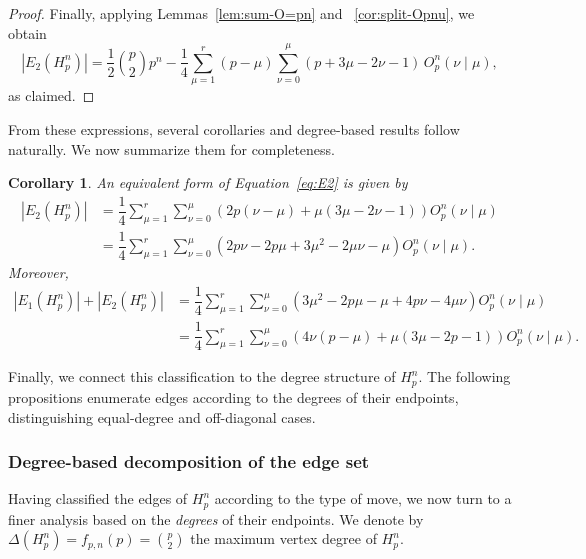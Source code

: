 \documentclass[letterpaper,12pt]{article}
\newtheorem{corollary}{Corollary}
\begin{document}
\begin{proof}
Finally, applying Lemmas~\ref{lem:sum-O=pn} and  ~\ref{cor:split-Opnu}, we obtain
\[
|E_2(H_p^n)| 
= \frac{1}{2} \binom{p}{2} p^n 
- \frac{1}{4} \sum_{\mu = 1}^{r} (p - \mu) 
\sum_{\nu = 0}^{\mu} 
(p + 3\mu - 2\nu - 1)\, O_p^n(\nu \mid \mu),
\]
as claimed.
\end{proof}



\noindent
From these expressions, several corollaries and degree-based results follow naturally.  
We now summarize them for completeness.

\begin{corollary}\label{coro:another_espression_of_E2}  
An equivalent form of Equation~\eqref{eq:E2} is given by
\begin{equation}
    \begin{aligned}
|E_2(H_p^n)|&=\dfrac{1}{4} \sum_{\mu = 1}^{r}  \sum_{\nu = 0}^{\mu} \left( 2p(\nu- \mu)  + \mu( 3\mu- 2\nu - 1) \right) O_p^n(\nu \mid \mu)\\
&=\dfrac{1}{4} \sum_{\mu = 1}^{r}  \sum_{\nu = 0}^{\mu} \left( 2p\nu- 2p\mu  + 3\mu^2- 2\mu\nu - \mu \right) O_p^n(\nu \mid \mu).
\end{aligned}
\end{equation}
Moreover,
\begin{equation}
    \begin{aligned}
|E_1(H_p^n)|+ |E_2(H_p^n)|
&= \dfrac{1}{4} \sum_{\mu = 1}^{r}  \sum_{\nu = 0}^{\mu} \left( 3\mu^{2} -2p\mu-\mu+4p\nu-4\mu\nu \right) O_p^n(\nu \mid \mu)\\
&= \dfrac{1}{4} \sum_{\mu = 1}^{r}  \sum_{\nu = 0}^{\mu} \left( 4\nu(p-\mu)+\mu(3\mu-2p-1)  \right) O_p^n(\nu \mid \mu).
\end{aligned}
\end{equation}
\end{corollary}


\noindent
Finally, we connect this classification to the degree structure of $H_p^n$.  
The following propositions enumerate edges according to the degrees of their endpoints, distinguishing equal-degree and off-diagonal cases.




\subsubsection*{Degree-based decomposition of the edge set}

Having classified the edges of $H_p^n$ according to the type of move, we now turn to a finer analysis based on the \emph{degrees} of their endpoints.  We denote by $\Delta(H_p^n)=f_{p,n}(p)=\binom{p}{2}$ the maximum vertex degree of $H_p^n$.
\end{document}
